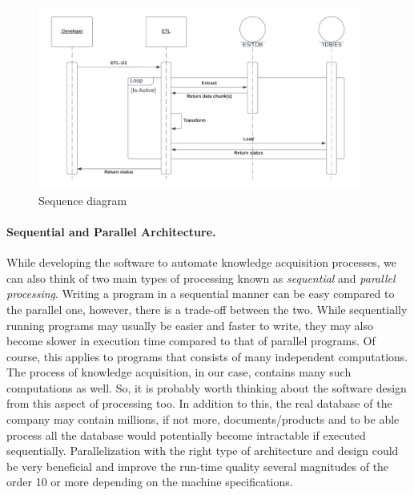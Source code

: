 \begin{figure}[H]
	\centering
	\includegraphics[width=0.95\textwidth]{../../resources/soft_sequence.png}
	\caption{Sequence diagram}
	\label{fig:soft_sequence}
\end{figure}

\paragraph{Sequential and Parallel Architecture.}
While developing the software to automate knowledge acquisition processes, we can also think of 
two main types of processing known as \textit{sequential} and \textit{parallel processing}. Writing 
a program in a sequential manner can be easy compared to the parallel one, however, there is a trade-off 
between the two. While sequentially running programs may usually be easier and faster to write, 
they may also become slower in execution time compared to that of parallel programs. Of course, this 
applies to programs that consists of many independent computations. The process of knowledge 
acquisition, in our case, contains many such computations as well. So, it is probably worth thinking 
about the software design from this aspect of processing too.
In addition to this, the real database of the company may contain millions, if not more, 
documents/products and to be able process all the database would potentially become intractable if 
executed sequentially. Parallelization with the right type of architecture and design could be 
very beneficial and improve the run-time quality several magnitudes of the order 10 or more depending 
on the machine specifications.

